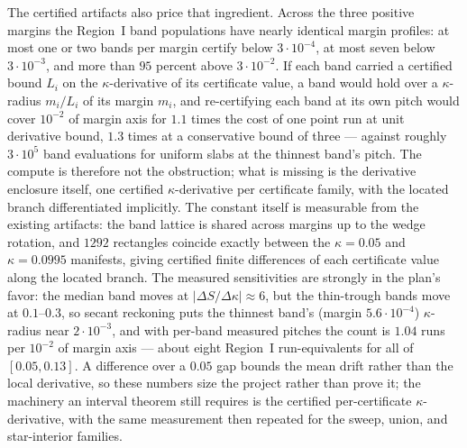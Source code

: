The certified artifacts also price that ingredient.  Across the three
positive margins the Region~I band populations have nearly identical
margin profiles: at most one or two bands per margin certify below
$3\cdot10^{-4}$, at most seven below $3\cdot10^{-3}$, and more than
$95$ percent above $3\cdot10^{-2}$.  If each band carried a certified
bound $L_i$ on the $\kappa$-derivative of its certificate value, a
band would hold over a $\kappa$-radius $m_i/L_i$ of its margin
$m_i$, and re-certifying each band at its own pitch would cover
$10^{-2}$ of margin axis for $1.1$ times the cost of one point run
at unit derivative bound, $1.3$ times at a conservative bound of
three --- against roughly $3\cdot10^{5}$ band evaluations for
uniform slabs at the thinnest band's pitch.  The
compute is therefore not the obstruction; what is missing is the
derivative enclosure itself, one certified $\kappa$-derivative per
certificate family, with the located branch differentiated
implicitly.  The constant itself is measurable from the existing
artifacts: the band lattice is shared across margins up to the wedge
rotation, and $1292$ rectangles coincide exactly between the
$\kappa=0.05$ and $\kappa=0.0995$ manifests, giving certified
finite differences of each certificate value along the located
branch.  The measured sensitivities are strongly in the plan's
favor: the median band moves at $|\Delta S/\Delta\kappa|\approx 6$,
but the thin-trough bands move at $0.1$--$0.3$, so secant reckoning
puts the thinnest band's (margin $5.6\cdot10^{-4}$) $\kappa$-radius
near $2\cdot10^{-3}$, and with per-band measured pitches the count
is $1.04$ runs per $10^{-2}$ of margin axis --- about eight
Region~I run-equivalents for all of $[0.05,0.13]$.  A difference
over a $0.05$ gap bounds the mean drift rather than the local
derivative, so these numbers size the project rather than prove it;
the machinery an interval theorem still requires is the certified
per-certificate $\kappa$-derivative, with the same measurement then
repeated for the sweep, union, and star-interior families.
